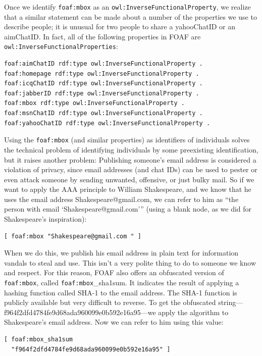 Once we identify \texttt{foaf:mbox} as an \texttt{owl:InverseFunctionalProperty}, we
realize that a similar statement can be made about a number of the
properties we use to describe people; it is unusual for two people to
share a yahooChatID or an aimChatID. In fact, all of the following
properties in FOAF are \texttt{owl:InverseFunctionalProperties}:

\begin{lstlisting}
foaf:aimChatID rdf:type owl:InverseFunctionalProperty . 
foaf:homepage rdf:type owl:InverseFunctionalProperty . 
foaf:icqChatID rdf:type owl:InverseFunctionalProperty . 
foaf:jabberID rdf:type owl:InverseFunctionalProperty . 
foaf:mbox rdf:type owl:InverseFunctionalProperty . 
foaf:msnChatID rdf:type owl:InverseFunctionalProperty .
foaf:yahooChatID rdf:type owl:InverseFunctionalProperty .
\end{lstlisting}

Using the \texttt{foaf:mbox} (and similar properties) as identifiers of
individuals solves the technical problem of identifying individuals by
some preexisting identification, but it raises another problem:
Publishing someone's email address is considered a violation of privacy,
since email addresses (and chat IDs) can be used to pester or even
attack someone by sending unwanted, offensive, or just bulky mail. So if
we want to apply the AAA principle to William Shakespeare, and we know
that he uses the email address
Shakespeare@gmail.com, we can refer
to him as ``the person with email `Shakespeare@gmail.com''' (using a
blank node, as we did for Shakespeare's inspiration):

\begin{lstlisting}
[ foaf:mbox "Shakespeare@gmail.com " ]
\end{lstlisting}

When we do this, we publish his email address in plain text for
information vandals to steal and use. This isn't a very polite thing to
do to someone we know and respect. For this reason, FOAF also offers an
obfuscated version of \texttt{foaf:mbox}, called \texttt{foaf:mbox}\_sha1sum. It indicates
the result of applying a hashing function called SHA-1 to the email
address. The SHA-1 function is publicly available but very difficult to
reverse. To get the obfuscated string---f964f2dfd4784fe9d68ada960099e0b592e16a95---we apply the algorithm to Shakespeare's email
address. Now we can refer to him using this value:

\begin{lstlisting}
[ foaf:mbox_sha1sum
  "f964f2dfd4784fe9d68ada960099e0b592e16a95" ]
\end{lstlisting}

